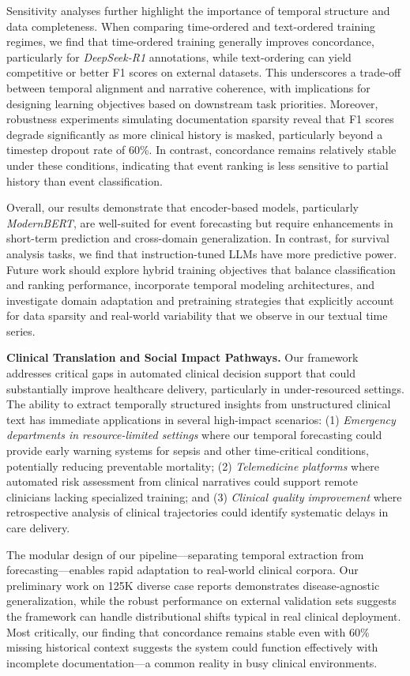 Sensitivity analyses further highlight the importance of temporal structure and data completeness. When comparing time-ordered and text-ordered training regimes, we find that time-ordered training generally improves concordance, particularly for \textit{DeepSeek-R1} annotations, while text-ordering can yield competitive or better F1 scores on external datasets. 
This underscores a trade-off between temporal alignment and narrative coherence, with implications for designing learning objectives based on downstream task priorities. 
Moreover, robustness experiments simulating documentation sparsity reveal that F1 scores degrade significantly as more clinical history is masked, particularly beyond a timestep dropout rate of 60\%. 
In contrast, concordance remains relatively stable under these conditions, indicating that event ranking is less sensitive to partial history than event classification.

Overall, our results demonstrate that encoder-based models, particularly \textit{ModernBERT}, are well-suited for event forecasting but require enhancements in short-term prediction and cross-domain generalization. 
In contrast, for survival analysis tasks, we find that instruction-tuned LLMs have more predictive power.
Future work should explore hybrid training objectives that balance classification and ranking performance, incorporate temporal modeling architectures, and investigate domain adaptation and pretraining strategies that explicitly account for data sparsity and real-world variability that we observe in our textual time series.

\textbf{Clinical Translation and Social Impact Pathways.} 
Our framework addresses critical gaps in automated clinical decision support that could substantially improve healthcare delivery, particularly in under-resourced settings. 
The ability to extract temporally structured insights from unstructured clinical text has immediate applications in several high-impact scenarios: 
(1) \emph{Emergency departments in resource-limited settings} where our temporal forecasting could provide early warning systems for sepsis and other time-critical conditions, potentially reducing preventable mortality; 
(2) \emph{Telemedicine platforms} where automated risk assessment from clinical narratives could support remote clinicians lacking specialized training; and 
(3) \emph{Clinical quality improvement} where retrospective analysis of clinical trajectories could identify systematic delays in care delivery.

The modular design of our pipeline—separating temporal extraction from forecasting—enables rapid adaptation to real-world clinical corpora. 
Our preliminary work on 125K diverse case reports demonstrates disease-agnostic generalization, while the robust performance on external validation sets suggests the framework can handle distributional shifts typical in real clinical deployment. 
Most critically, our finding that concordance remains stable even with 60\% missing historical context suggests the system could function effectively with incomplete documentation—a common reality in busy clinical environments.

